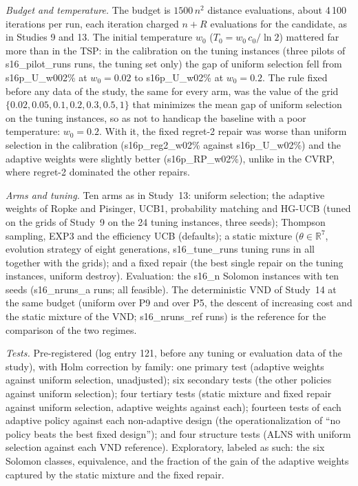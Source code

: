 \emph{Budget and temperature.} The budget is $1500\,n^2$ distance evaluations, about 4\,100 iterations per run, each iteration charged $n+R$ evaluations for the candidate, as in Studies 9 and 13. The initial temperature $w_0$ ($T_0=w_0\,c_0/\ln 2$) mattered far more than in the TSP: in the calibration on the tuning instances (three pilots of \num{s16_pilot_runs} runs, the tuning set only) the gap of uniform selection fell from \num{s16p_U_w002}\% at $w_0=0.02$ to \num{s16p_U_w02}\% at $w_0=0.2$. The rule fixed before any data of the study, the same for every arm, was the value of the grid $\{0.02, 0.05, 0.1, 0.2, 0.3, 0.5, 1\}$ that minimizes the mean gap of uniform selection on the tuning instances, so as not to handicap the baseline with a poor temperature: $w_0=0.2$. With it, the fixed regret-2 repair was worse than uniform selection in the calibration (\num{s16p_reg2_w02}\% against \num{s16p_U_w02}\%) and the adaptive weights were slightly better (\num{s16p_RP_w02}\%), unlike in the CVRP, where regret-2 dominated the other repairs.

\emph{Arms and tuning.} Ten arms as in Study~13: uniform selection; the adaptive weights of Ropke and Pisinger, UCB1, probability matching and HG-UCB (tuned on the grids of Study~9 on the 24 tuning instances, three seeds); Thompson sampling, EXP3 and the efficiency UCB (defaults); a static mixture ($\theta\in\mathbb{R}^7$, evolution strategy of eight generations, \num{s16_tune_runs} tuning runs in all together with the grids); and a fixed repair (the best single repair on the tuning instances, uniform destroy). Evaluation: the \num{s16_n} Solomon instances with ten seeds (\num{s16_nruns_a} runs; all feasible). The deterministic VND of Study~14 at the same budget (uniform over P9 and over P5, the descent of increasing cost and the static mixture of the VND; \num{s16_nruns_ref} runs) is the reference for the comparison of the two regimes.

\emph{Tests.} Pre-registered (log entry 121, before any tuning or evaluation data of the study), with Holm correction by family: one primary test (adaptive weights against uniform selection, unadjusted); six secondary tests (the other policies against uniform selection); four tertiary tests (static mixture and fixed repair against uniform selection, adaptive weights against each); fourteen tests of each adaptive policy against each non-adaptive design (the operationalization of ``no policy beats the best fixed design''); and four structure tests (ALNS with uniform selection against each VND reference). Exploratory, labeled as such: the six Solomon classes, equivalence, and the fraction of the gain of the adaptive weights captured by the static mixture and the fixed repair.

